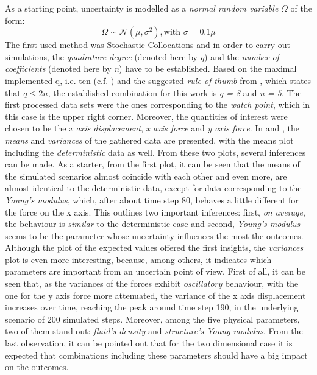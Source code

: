 	As a starting point, uncertainty is modelled as a \textit{normal random variable} $\Omega$ of the form:
\begin{equation} \label{1DSCGaussian}
\Omega \sim \mathcal{N}(\mu, \sigma^2), \text{with } \sigma = 0.1\mu
\end{equation}
	The first used method was Stochastic Collocations and in order to carry out simulations, the \emph{quadrature degree} (denoted here by \emph{q}) and the \emph{number of coefficients} (denoted here by \emph{n}) have to be established. Based on the maximal implemented q, i.e. ten (c.f. ) and the suggested  \emph{rule of thumb} from \cite{Su08}, which states that $q \leq 2 n$, the established combination for this work is \emph{q = 8} and \emph{n = 5}.
The first processed data sets were the ones corresponding to the \emph{watch point}, which in this case is the upper right corner. Moreover, the quantities of interest were chosen to be the \emph{x axis displacement}, \emph{x axis force} and \emph{y axis force}. 
In  and , the \emph{means} and \emph{variances} of the gathered data are presented, with the means plot including the \emph{deterministic} data as well. From these two plots, several inferences can be made. As a starter, from the first plot, it can be seen that the means of the simulated scenarios almost coincide with each other and even more, are  almost identical to the deterministic data, except for data corresponding to the \emph{Young's modulus}, which, after about time step 80, behaves a little different for the force on the x axis. This outlines two important inferences: first, \emph{on average}, the behaviour is \emph{similar} to the deterministic case and second, \emph{Young's modulus} seems to be the parameter whose uncertainty influences the most the outcomes. Although the plot of the expected values offered the first insights, the \emph{variances} plot is even more interesting, because, among others, it indicates which parameters are important from an uncertain point of view. First of all, it can be seen that, as the variances of the forces exhibit \emph{oscillatory} behaviour, with the one for the y axis force more attenuated, the variance of the x axis displacement increases over time, reaching the peak around time step 190, in the underlying scenario of 200 simulated steps. Moreover, among the five physical parameters, two of them stand out: \emph{fluid's density} and \emph{structure's Young modulus}. From the last observation, it can be pointed out that for the two dimensional case it is expected that combinations including these parameters should have a big impact on the outcomes.

